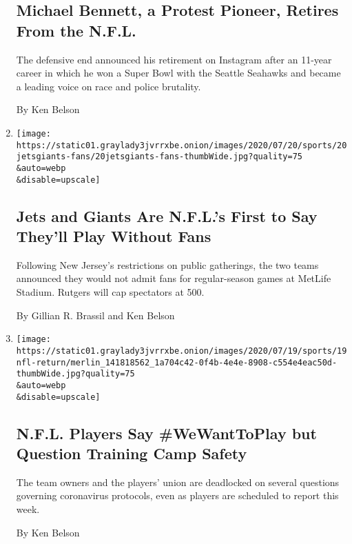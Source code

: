 \begin{enumerate}
  \hypertarget{michael-bennett-a-protest-pioneer-retires-from-the-nfl}{%
  \subsection{Michael Bennett, a Protest Pioneer, Retires From the
  N.F.L.}\label{michael-bennett-a-protest-pioneer-retires-from-the-nfl}}

  The defensive end announced his retirement on Instagram after an
  11-year career in which he won a Super Bowl with the Seattle Seahawks
  and became a leading voice on race and police brutality.

  By Ken Belson
\item
  \href{/2020/07/20/sports/football/jets-giants-rutgers-fans-metlife-stadium.html}{}

  \texttt{[image: https://static01.graylady3jvrrxbe.onion/images/2020/07/20/sports/20jetsgiants-fans/20jetsgiants-fans-thumbWide.jpg?quality=75\\\&auto=webp\\\&disable=upscale]}

  \hypertarget{jets-and-giants-are-nfls-first-to-say-theyll-play-without-fans}{%
  \subsection{Jets and Giants Are N.F.L.'s First to Say They'll Play
  Without
  Fans}\label{jets-and-giants-are-nfls-first-to-say-theyll-play-without-fans}}

  Following New Jersey's restrictions on public gatherings, the two
  teams announced they would not admit fans for regular-season games at
  MetLife Stadium. Rutgers will cap spectators at 500.

  By Gillian R. Brassil and Ken Belson
\item
  \href{/2020/07/20/sports/football/nfl-training-camp-players.html}{}

  \texttt{[image: https://static01.graylady3jvrrxbe.onion/images/2020/07/19/sports/19nfl-return/merlin\_141818562\_1a704c42-0f4b-4e4e-8908-c554e4eac50d-thumbWide.jpg?quality=75\\\&auto=webp\\\&disable=upscale]}

  \hypertarget{nfl-players-say-wewanttoplay-but-question-training-camp-safety}{%
  \subsection{N.F.L. Players Say \#WeWantToPlay but Question Training
  Camp
  Safety}\label{nfl-players-say-wewanttoplay-but-question-training-camp-safety}}

  The team owners and the players' union are deadlocked on several
  questions governing coronavirus protocols, even as players are
  scheduled to report this week.

  By Ken Belson
\end{enumerate}

